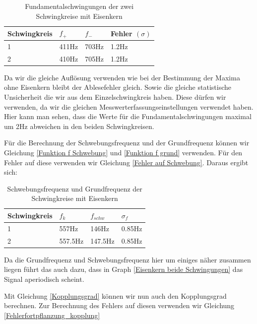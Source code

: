 \documentclass[twoside]{protokoll}
\begin{document}
\begin{table}[H]
    \centering
    \begin{tabularx}{1\textwidth}{X X X X} %
        \toprule
        \textbf{Schwingkreis} & \textbf{$f_+$ } & \textbf{$f_-$ } & \textbf{Fehler $(\sigma)$}\\
        \midrule
        1 & 411Hz & 703Hz & 1.2Hz\\
        2 & 410Hz & 705Hz & 1.2Hz\\
        \bottomrule
    \end{tabularx}
    \caption{Fundamentalschwingungen der zwei Schwingkreise mit Eisenkern}
    \label{•}
\end{table}

Da wir die gleiche Auflösung verwenden wie bei der Bestimmung der Maxima ohne Eisenkern bleibt der Ablesefehler gleich. Sowie die gleiche statistische Unsicherheit die wir aus dem Einzelschwingkreis haben. Diese dürfen wir verwenden, da wir die gleichen Messwerterfassungseinstellungen verwendet haben. 
Hier kann man sehen, dass die Werte für die Fundamentalschwingungen maximal um 2Hz abweichen in den beiden Schwingkreisen.

Für die Berechnung der Schwebungsfrequenz und der Grundfrequenz können wir Gleichung \ref{Funktion f Schwebung} und \ref{Funktion f grund} verwenden. 
Für den Fehler auf diese verwenden wir Gleichung \ref{Fehler auf Schwebung}.
Daraus ergibt sich:

\begin{table}[H]
    \centering
    \begin{tabularx}{1\textwidth}{X X X X} %
        \toprule
        \textbf{Schwingkreis} & \textbf{$f_k$} & \textbf{$f_{schw}$} & \textbf{$\sigma_f$} \\
        \midrule
        1 & 557Hz & 146Hz & 0.85Hz\\
        2 & 557.5Hz & 147.5Hz & 0.85Hz \\
        \bottomrule
    \end{tabularx}
    \caption{Schwebungsfrequenz und Grundfrequenz der Schwingkreise mit Eisenkern}
    \label{•}
\end{table} 
Da die Grundfrequenz und Schwebungsfrequenz hier um einiges näher zusammen liegen führt das auch dazu, dass in Graph \ref{Eisenkern beide Schwingungen} das Signal aperiodisch scheint.

Mit Gleichung \ref{Kopplungsgrad} können wir nun auch den Kopplungsgrad berechnen. Zur Berechnung des Fehlers auf diesen verwenden wir Gleichung \ref{Fehlerfortpflanzung_kopplung}
\end{document}
